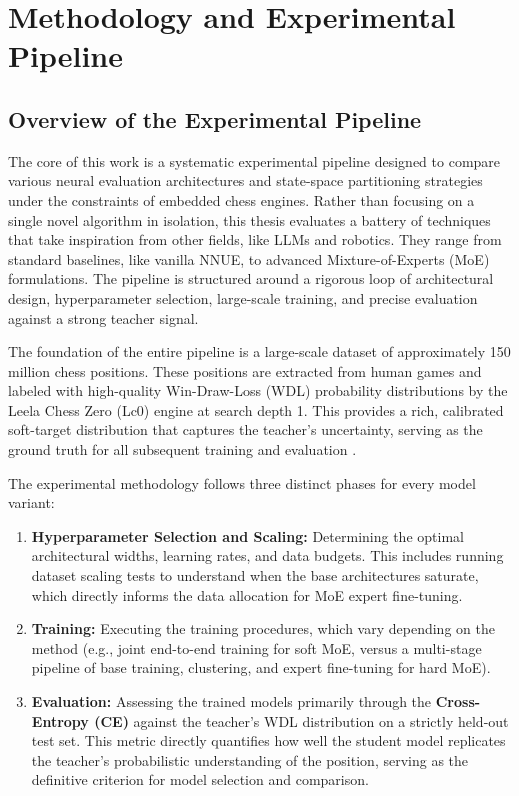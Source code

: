 \chapter{Methodology and Experimental Pipeline}

\section{Overview of the Experimental Pipeline}

The core of this work is a systematic experimental pipeline designed to compare various neural evaluation architectures and state-space partitioning strategies under the constraints of embedded chess engines. Rather than focusing on a single novel algorithm in isolation, this thesis evaluates a battery of techniques that take inspiration from other fields, like LLMs and robotics. They range from standard baselines, like vanilla NNUE, to advanced Mixture-of-Experts (MoE) formulations. The pipeline is structured around a rigorous loop of architectural design, hyperparameter selection, large-scale training, and precise evaluation against a strong teacher signal.

The foundation of the entire pipeline is a large-scale dataset of approximately 150 million chess positions. These positions are extracted from human games and labeled with high-quality Win-Draw-Loss (WDL) probability distributions by the Leela Chess Zero (Lc0) engine at search depth 1. This provides a rich, calibrated soft-target distribution that captures the teacher's uncertainty, serving as the ground truth for all subsequent training and evaluation \parencite{lczero}.

The experimental methodology follows three distinct phases for every model variant:

\begin{enumerate}
\item \textbf{Hyperparameter Selection and Scaling:} Determining the optimal architectural widths, learning rates, and data budgets. This includes running dataset scaling tests to understand when the base architectures saturate, which directly informs the data allocation for MoE expert fine-tuning.
\item \textbf{Training:} Executing the training procedures, which vary depending on the method (e.g., joint end-to-end training for soft MoE, versus a multi-stage pipeline of base training, clustering, and expert fine-tuning for hard MoE).
\item \textbf{Evaluation:} Assessing the trained models primarily through the \textbf{Cross-Entropy (CE)} against the teacher's WDL distribution on a strictly held-out test set. This metric directly quantifies how well the student model replicates the teacher's probabilistic understanding of the position, serving as the definitive criterion for model selection and comparison.
\end{enumerate}

